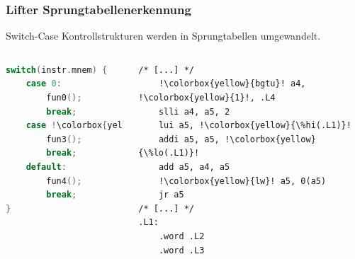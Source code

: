 \begin{frame}[fragile]
    \frametitle{Lifter Sprungtabellenerkennung}{Switch-Case Kontrollstrukturen werden in Sprungtabellen umgewandelt.}\vspace{1em}
    \begin{columns}[c]
        \begin{lstlisting}[language=c, escapechar=!]
switch(instr.mnem) {
    case 0:
        fun0();
        break;
    case !\colorbox{yellow}{1}!:
        fun3();
        break;
    default:
        fun4();
        break;
}
        \end{lstlisting}
        \begin{lstlisting}[language=rv64, escapechar=!]
/* [...] */
    !\colorbox{yellow}{bgtu}! a4, !\colorbox{yellow}{1}!, .L4
    slli a4, a5, 2
    lui a5, !\colorbox{yellow}{\%hi(.L1)}!
    addi a5, a5, !\colorbox{yellow}{\%lo(.L1)}!
    add a5, a4, a5
    !\colorbox{yellow}{lw}! a5, 0(a5)
    jr a5
/* [...] */
.L1:
    .word .L2
    .word .L3
        \end{lstlisting}
    \end{columns}
\end{frame}
\clearpage


